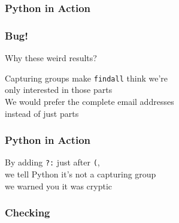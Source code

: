 \begin{frame}
  \frametitle{Python in Action}
\end{frame}

\begin{frame}
  \frametitle{Bug!}
  \vskip5mm
  \begin{overprint}
    \begin{center}
      Why these weird results?
    \end{center}
    \begin{center}
      Capturing groups make \texttt{findall} think we're \\ only interested
      in those parts \\[2mm]
      We would prefer the complete email addresses \\ instead of just parts
    \end{center}
  \end{overprint}
\end{frame}

\begin{frame}
  \frametitle{Python in Action}
  \begin{center}
    By adding \texttt{?:} just after \texttt{(}, \\
    we tell Python it's not a capturing group \\[2mm]
    {\tiny we warned you it was cryptic}
  \end{center}
\end{frame}

\begin{frame}
  \frametitle{Checking}
\end{frame}
